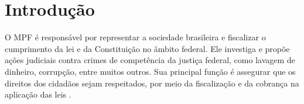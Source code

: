 \section{Introdução}

O MPF é responsável por representar a sociedade brasileira e fiscalizar o cumprimento da lei e da Constituição no âmbito federal. Ele investiga e propõe ações judiciais contra crimes de competência da justiça federal, como lavagem de dinheiro, corrupção, entre muitos outros. Sua principal função é assegurar que os direitos dos cidadãos sejam respeitados, por meio da fiscalização e da cobrança na aplicação das leis \cite{Sobre_o_MPF}.
